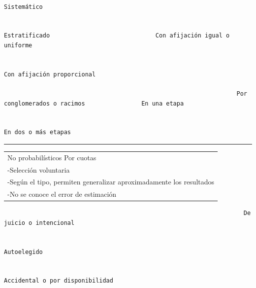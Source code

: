 \documentclass[]{book}
\begin{document}
\begin{verbatim}
                                                                  Sistemático                                

                                                                  Estratificado                              Con afijación igual o uniforme
                                                                                                             
                                                                                                             Con afijación proporcional

                                                                  Por conglomerados o racimos                En una etapa
                                                                                                             
                                                                                                             En dos o más etapas
\end{verbatim}

\begin{center}\rule{0.5\linewidth}{\linethickness}\end{center}

\begin{longtable}[]{@{}l@{}}
\toprule
\endhead
\begin{minipage}[t]{0.95\columnwidth}\raggedright
No probabilísticos Por cuotas\strut
\end{minipage}\tabularnewline
\begin{minipage}[t]{0.95\columnwidth}\raggedright
-Selección voluntaria\strut
\end{minipage}\tabularnewline
\begin{minipage}[t]{0.95\columnwidth}\raggedright
-Según el tipo, permiten generalizar aproximadamente los resultados\strut
\end{minipage}\tabularnewline
\begin{minipage}[t]{0.95\columnwidth}\raggedright
-No se conoce el error de estimación\strut
\end{minipage}\tabularnewline
\bottomrule
\end{longtable}

\begin{verbatim}
                                                                    De juicio o intencional

                                                                    Autoelegido

                                                                    Accidental o por disponibilidad
\end{verbatim}
\end{document}
